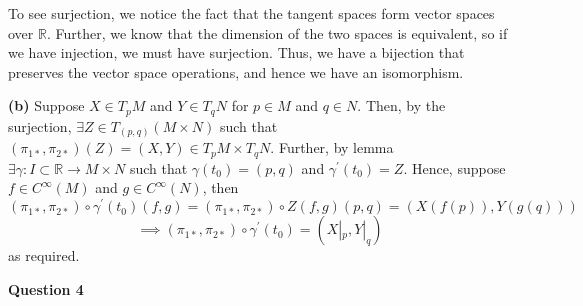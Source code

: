 \documentclass[10pt]{article}
\newcommand{\R}{\mathbb{R}}
\begin{document}
To see surjection, we notice the fact that the tangent spaces form vector spaces over $\R$. Further, we know that the dimension of the two spaces is equivalent, so if we have injection, we must have surjection. Thus, we have a bijection that preserves the vector space operations, and hence we have an isomorphism.

\textbf{(b)} Suppose $X\in T_{p}M$ and $Y\in T_{q}N$ for $p\in M$ and $q\in N$. Then, by the surjection, $\exists Z\in T_{(p,q)}(M\times N)$ such that $(\pi_{1*},\pi_{2*})(Z) = (X,Y)\in T_{p}M\times T_{q}N$. Further, by lemma $\exists \gamma: I\subset \R \to M\times N$ such that $\gamma(t_{0}) = (p,q)$ and $\gamma^{\prime}(t_{0}) = Z$. Hence, suppose $f \in C^{\infty}(M)$ and $g\in C^{\infty}(N)$, then
\[(\pi_{1*},\pi_{2*})\circ \gamma^{\prime}(t_{0})(f,g) = (\pi_{1*},\pi_{2*})\circ Z(f,g)(p,q) = (X(f(p)),Y(g(q))) \]
\[ \implies (\pi_{1*},\pi_{2*})\circ \gamma^{\prime}(t_{0}) = (X|_{p},Y|_{q}) \]
as required.

\newpage
\textbf{Question 4}

\newpage
\end{document}
